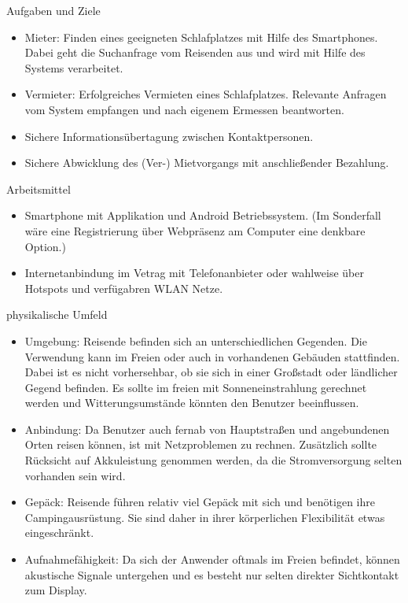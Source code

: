 \newpage


Aufgaben und Ziele
\begin{itemize}
   \item 
   Mieter: Finden eines geeigneten Schlafplatzes mit Hilfe des Smartphones. Dabei geht die Suchanfrage vom Reisenden aus und wird mit Hilfe des Systems verarbeitet. 
   \item 
   Vermieter: Erfolgreiches Vermieten eines Schlafplatzes. Relevante Anfragen vom System empfangen und nach eigenem Ermessen beantworten. 
   \item
   Sichere Informationsübertagung zwischen Kontaktpersonen.
   \item
   Sichere Abwicklung des (Ver-) Mietvorgangs mit anschließender Bezahlung.\\  


\end{itemize}


Arbeitsmittel
\begin{itemize}
   \item 
   Smartphone mit Applikation und Android Betriebssystem. (Im Sonderfall wäre eine Registrierung über Webpräsenz am Computer eine denkbare Option.) 
   \item  
   Internetanbindung im Vetrag mit Telefonanbieter oder wahlweise über Hotspots und verfügabren WLAN Netze.\\
   

\end{itemize}


physikalische Umfeld
\begin{itemize}

   \item 
   Umgebung: Reisende befinden sich an unterschiedlichen Gegenden. Die Verwendung kann im Freien oder auch in vorhandenen Gebäuden stattfinden. Dabei ist es nicht vorhersehbar, ob sie sich in einer Großstadt oder ländlicher Gegend befinden. Es sollte im freien mit Sonneneinstrahlung gerechnet werden und Witterungsumstände könnten den Benutzer beeinflussen.

   \item
   Anbindung: Da Benutzer auch fernab von Hauptstraßen und angebundenen Orten reisen können, ist mit Netzproblemen zu rechnen. Zusätzlich sollte Rücksicht auf Akkuleistung genommen werden, da die Stromversorgung selten vorhanden sein wird. 

   \item
   Gepäck: Reisende führen relativ viel Gepäck mit sich und benötigen ihre Campingausrüstung. Sie sind daher in ihrer körperlichen Flexibilität etwas eingeschränkt.

   \item
   Aufnahmefähigkeit: Da sich der Anwender oftmals im Freien befindet, können akustische Signale untergehen und es besteht nur selten direkter Sichtkontakt zum Display.
\end{itemize}



